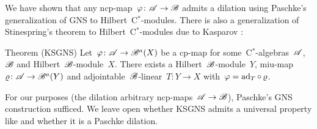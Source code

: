 \documentclass[b]{subfiles}
\begin{document}
\begin{parsec}[ksgns]%
\begin{point}%
We have shown that any ncp-map~$\varphi\colon \mathscr{A} \to \mathscr{B}$
    admits a dilation using Paschke's generalization of GNS
    to Hilbert~C$^*$-modules.
There is also a generalization of Stinespring's theorem
    to Hilbert~C$^*$-modules
    due to Kasparov \cite{ksgns}:
\end{point}
\begin{point}{Theorem (KSGNS)}%
Let~$\varphi\colon \mathscr{A} \to \mathscr{B}^a(X)$
    be a cp-map
    for some~C$^*$-algebras~$\mathscr{A}$, $\mathscr{B}$
    and Hilbert~$\mathscr{B}$-module~$X$.
There exists a Hilbert~$\mathscr{B}$-module~$Y$,
    miu-map~$\varrho\colon \mathscr{A} \to \mathscr{B}^a(Y)$
    and adjointable~$\mathscr{B}$-linear~$T\colon Y\to X$
    with~$\varphi = \mathrm{ad}_T \mathop{\circ} \varrho$.
\end{point}
\begin{point}%
For our purposes (the dilation arbitrary ncp-maps~$\mathscr{A} \to \mathscr{B}$),
    Paschke's GNS construction sufficed.
We leave open whether
    KSGNS admits a universal property like 
    and whether it is a Paschke dilation.
\end{point}
\end{parsec}
\end{document}
